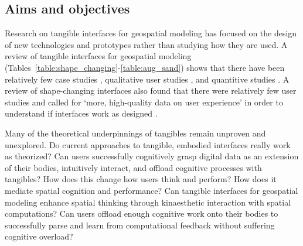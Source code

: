 \documentclass[prodmode,acmtochi]{acmsmall} %
\begin{document}

\subsection{Aims and objectives}

Research on tangible interfaces for geospatial modeling 
has focused on the design of new technologies and prototypes
rather than studying how they
are used. 
%
A review of tangible interfaces for geospatial modeling 
(Tables~\ref{table:shape_changing}-\ref{table:aug_sand})
shows that there have been 
relatively few case studies \cite{Ishii2002,Tateosian2010,Petrasova2015}, 
qualitative user studies \cite{Shamonsky2003,Woods2016},
and quantitive studies \cite{Harmon2016,Harmon2016a,SchmidtDaly2016}.
%
A review of shape-changing interfaces 
also found that there were relatively few user studies
and called for `more, high-quality data on user experience'
in order to understand if interfaces work as designed
\cite{Rasmussen2012}.

Many of the theoretical underpinnings of tangibles 
remain unproven and unexplored. 
Do current approaches to tangible, embodied interfaces
really work as theorized? 
Can users successfully
cognitively grasp digital data as an extension of their bodies,
intuitively interact, 
and offload cognitive processes
with tangibles?
How does this change how users think and perform?
How does it mediate spatial cognition and performance? 
Can tangible interfaces for geospatial modeling 
enhance spatial thinking
through kinaesthetic interaction with 
spatial computations?
Can users offload enough cognitive work onto their bodies
to successfully parse and learn from computational feedback
without suffering cognitive overload?
\end{document}
